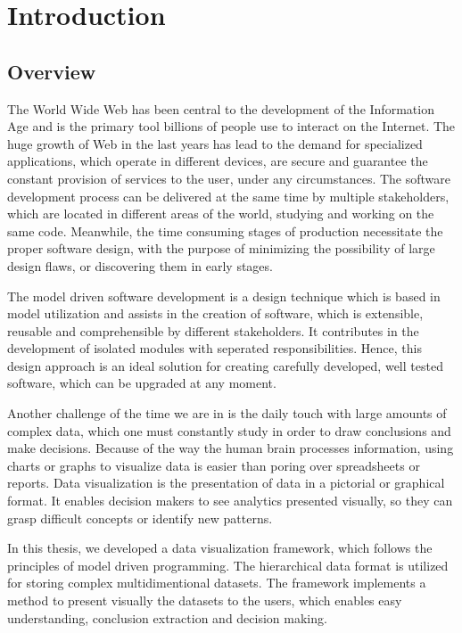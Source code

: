 
\chapter{Introduction} %

\section{Overview}
The World Wide Web has been central to the development of the Information Age and is the primary tool billions of people use to interact on the Internet. The huge growth of Web in the last years has lead to the demand for specialized applications, which operate in different devices, are secure and guarantee the constant provision of services to the user, under any circumstances. The software development 
process can be delivered at the same time by multiple stakeholders, which are located in different areas of the world, studying and working on the same code. Meanwhile, the time consuming stages of production necessitate the proper software design, with the purpose of minimizing the possibility of large design flaws, or discovering them in early stages. \par 
	The model driven software development is a design technique which is based in model utilization and assists in the creation of software, which is extensible, reusable and comprehensible by different stakeholders. It contributes in the development of isolated modules with seperated responsibilities. Hence, this design approach is an ideal solution for creating carefully developed, well tested software, which can be upgraded at any moment. \par 
	Another challenge of the time we are in is the daily touch with large amounts of complex data, which one must constantly study in order to draw conclusions and make decisions. Because of the way the human brain processes information, using charts or graphs to visualize data is easier than poring over spreadsheets or reports. Data visualization is the presentation of data in a pictorial or graphical format. It enables decision makers to see analytics presented visually, so they can grasp difficult concepts or identify new patterns. \par
	In this thesis, we developed a data visualization framework, which follows the principles of model driven programming. The hierarchical data format is utilized for storing complex multidimentional datasets. The framework implements a method to present visually the datasets to the users, which enables easy understanding, conclusion extraction and decision making. \par 
